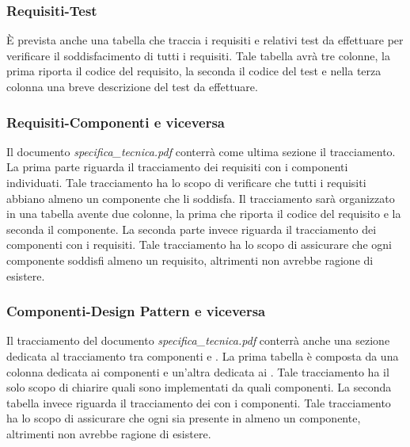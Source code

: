 {\subsubsection{Requisiti-Test}
È prevista anche una tabella che traccia i requisiti e relativi test da effettuare per verificare il soddisfacimento di tutti i requisiti. Tale tabella avrà tre colonne, la prima riporta il codice del requisito, la seconda il codice del test e nella terza colonna una breve descrizione del test da effettuare.
\clearpage

\subsubsection{Requisiti-Componenti e viceversa}
Il documento \textit{specifica\_tecnica.pdf} conterrà come ultima sezione il tracciamento. La prima parte riguarda il tracciamento dei requisiti con i componenti individuati. Tale tracciamento ha lo scopo di verificare che tutti i requisiti abbiano almeno un componente che li soddisfa. Il tracciamento sarà organizzato in una tabella avente due colonne, la prima che riporta il codice del requisito e la seconda il componente.
La seconda parte invece riguarda il tracciamento dei componenti con i requisiti. Tale tracciamento ha lo scopo di assicurare che ogni componente soddisfi almeno un requisito, altrimenti non avrebbe ragione di esistere.


\subsubsection{Componenti-Design Pattern e viceversa}
Il tracciamento del documento \textit{specifica\_tecnica.pdf} conterrà anche una sezione dedicata al tracciamento tra componenti e . La prima tabella è composta da una colonna dedicata ai componenti e un'altra dedicata ai . Tale tracciamento ha il solo scopo di chiarire quali  sono implementati da quali componenti.
La seconda tabella invece riguarda il tracciamento dei  con i componenti. Tale tracciamento ha lo scopo di assicurare che ogni  sia presente in almeno un componente, altrimenti non avrebbe ragione di esistere.


}
